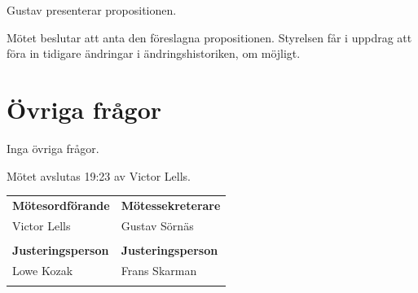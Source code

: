 \documentclass[a4paper]{article}
\begin{document}
Gustav presenterar propositionen.

Mötet beslutar att anta den föreslagna propositionen. Styrelsen får i uppdrag
att föra in tidigare ändringar i ändringshistoriken, om möjligt.

\section{Övriga frågor}

Inga övriga frågor.

Mötet avslutas 19:23 av Victor Lells.

\vspace{2em}

\begin{center}
\begin{tabular}{@{}p{}p{}@{}}
  \textbf{Mötesordförande} & \textbf{Mötessekreterare} \\[0.3em]
  Victor Lells & Gustav Sörnäs \\
  \vspace{8em} &\\
  \textbf{Justeringsperson} & \textbf{Justeringsperson} \\[0.3em]
  Lowe Kozak & Frans Skarman \\
  \vspace{8em} &\\
\end{tabular}
\end{center}

\appendix


\clearpage

\clearpage

\end{document}
